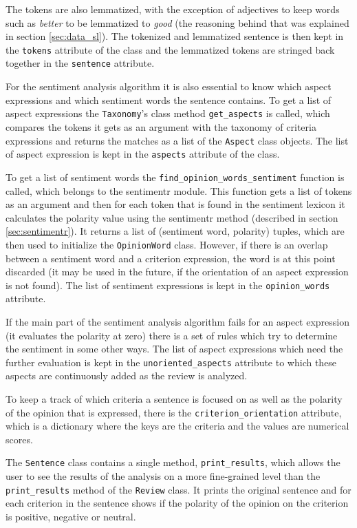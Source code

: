 The tokens are also lemmatized, with the exception of adjectives to keep words such as \textit{better} to be lemmatized to \textit{good} (the reasoning behind that was explained in section \ref{sec:data_sl}).
The tokenized and lemmatized sentence is then kept in the \texttt{tokens} attribute of the class and the lemmatized tokens are stringed back together in the \texttt{sentence} attribute. 

For the sentiment analysis algorithm it is also essential to know which aspect expressions and which sentiment words the sentence contains. To get a list of aspect expressions the \texttt{Taxonomy}'s class method \texttt{get\_aspects} is called, which compares the tokens it gets as an argument with the taxonomy of criteria expressions and returns the matches as a list of the \texttt{Aspect} class objects. The list of aspect expression is kept in the \texttt{aspects} attribute of the class.

To get a list of sentiment words the \texttt{find\_opinion\_words\_sentiment} function is called, which belongs to the sentimentr module. This function gets a list of tokens as an argument and then for each token that is found in the sentiment lexicon it calculates the polarity value using the sentimentr method (described in section \ref{sec:sentimentr}). It returns a list of (sentiment word, polarity) tuples, which are then used to initialize the \texttt{OpinionWord} class. However, if there is an overlap between a sentiment word and a criterion expression, the word is at this point discarded (it may be used in the future, if the orientation of an aspect expression is not found). The list of sentiment expressions is kept in the \texttt{opinion\_words} attribute.

If the main part of the sentiment analysis algorithm fails for an aspect expression (it evaluates the polarity at zero) there is a set of rules which try to determine the sentiment in some other ways. The list of aspect expressions which need the further evaluation is kept in the \texttt{unoriented\_aspects} attribute to which these aspects are continuously added as the review is analyzed.

To keep a track of which criteria a sentence is focused on as well as the polarity of the opinion that is expressed, there is the \texttt{criterion\_orientation} attribute, which is a dictionary where the keys are the criteria and the values are numerical scores.

The \texttt{Sentence} class contains a single method, \texttt{print\_results}, which allows the user to see the results of the analysis on a more fine-grained level than the \texttt{print\_results} method of the \texttt{Review} class. It prints the original sentence and for each criterion in the sentence shows if the polarity of the opinion on the criterion is positive, negative or neutral.

